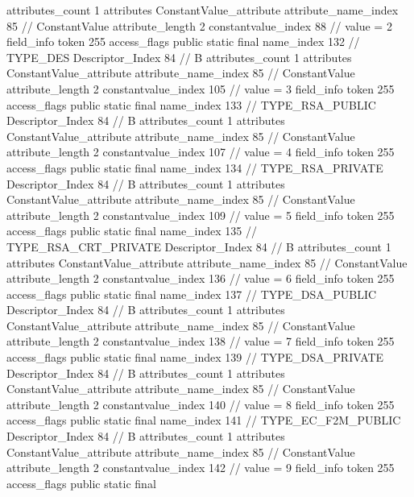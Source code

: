 {{{{{				attributes_count	1
				attributes {
				ConstantValue_attribute {
					attribute_name_index	85		// ConstantValue
					attribute_length	2
					constantvalue_index	88		// value = 2
				}
				}
			}
			field_info {
				token	255
				access_flags	public static final
				name_index	132		// TYPE_DES
				Descriptor_Index	84		// B
				attributes_count	1
				attributes {
				ConstantValue_attribute {
					attribute_name_index	85		// ConstantValue
					attribute_length	2
					constantvalue_index	105		// value = 3
				}
				}
			}
			field_info {
				token	255
				access_flags	public static final
				name_index	133		// TYPE_RSA_PUBLIC
				Descriptor_Index	84		// B
				attributes_count	1
				attributes {
				ConstantValue_attribute {
					attribute_name_index	85		// ConstantValue
					attribute_length	2
					constantvalue_index	107		// value = 4
				}
				}
			}
			field_info {
				token	255
				access_flags	public static final
				name_index	134		// TYPE_RSA_PRIVATE
				Descriptor_Index	84		// B
				attributes_count	1
				attributes {
				ConstantValue_attribute {
					attribute_name_index	85		// ConstantValue
					attribute_length	2
					constantvalue_index	109		// value = 5
				}
				}
			}
			field_info {
				token	255
				access_flags	public static final
				name_index	135		// TYPE_RSA_CRT_PRIVATE
				Descriptor_Index	84		// B
				attributes_count	1
				attributes {
				ConstantValue_attribute {
					attribute_name_index	85		// ConstantValue
					attribute_length	2
					constantvalue_index	136		// value = 6
				}
				}
			}
			field_info {
				token	255
				access_flags	public static final
				name_index	137		// TYPE_DSA_PUBLIC
				Descriptor_Index	84		// B
				attributes_count	1
				attributes {
				ConstantValue_attribute {
					attribute_name_index	85		// ConstantValue
					attribute_length	2
					constantvalue_index	138		// value = 7
				}
				}
			}
			field_info {
				token	255
				access_flags	public static final
				name_index	139		// TYPE_DSA_PRIVATE
				Descriptor_Index	84		// B
				attributes_count	1
				attributes {
				ConstantValue_attribute {
					attribute_name_index	85		// ConstantValue
					attribute_length	2
					constantvalue_index	140		// value = 8
				}
				}
			}
			field_info {
				token	255
				access_flags	public static final
				name_index	141		// TYPE_EC_F2M_PUBLIC
				Descriptor_Index	84		// B
				attributes_count	1
				attributes {
				ConstantValue_attribute {
					attribute_name_index	85		// ConstantValue
					attribute_length	2
					constantvalue_index	142		// value = 9
				}
				}
			}
			field_info {
				token	255
				access_flags	public static final
}}}}}

